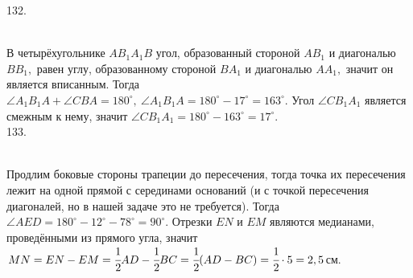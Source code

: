 \documentclass[12pt]{article}
\begin{document}
132. \begin{figure}[ht!]
\end{figure}\\
В четырёхугольнике $AB_1A_1B$ угол, образованный стороной $AB_1$ и диагональю $BB_1,$ равен углу, образованному стороной $BA_1$ и диагональю $AA_1,$ значит он является вписанным. Тогда $\angle A_1B_1A+\angle CBA=180^\circ,\ \angle A_1B_1A=180^\circ-17^\circ=163^\circ.$ Угол $\angle CB_1A_1$ является смежным к нему, значит $\angle CB_1A_1=180^\circ-163^\circ=17^\circ.$\\
133. \begin{figure}[ht!]
\end{figure}\\
Продлим боковые стороны трапеции до пересечения, тогда точка их пересечения лежит на одной прямой с серединами оснований (и с точкой пересечения диагоналей, но в нашей задаче это не требуется). Тогда $\angle AED=180^\circ-12^\circ-78^\circ=90^\circ.$ Отрезки $EN$ и $EM$ являются медианами, проведёнными из прямого угла, значит $MN=EN-EM=\cfrac{1}{2}AD-\cfrac{1}{2}BC=\cfrac{1}{2}(AD-BC)=\cfrac{1}{2}\cdot5=2,5$см.\newpage\noindent
\end{document}
